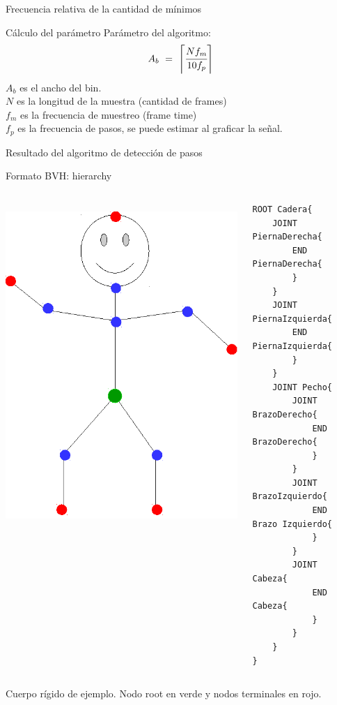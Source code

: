 \documentclass[aspectratio=169,spanish]{beamer} %
\begin{document}
\begin{frame}{Frecuencia relativa de la cantidad de mínimos}
    
\end{frame}

\begin{frame}{Cálculo del parámetro}
    Parámetro del algoritmo:
    \begin{equation}\label{ancho_b}
         A_b\ =\ \left\lceil \cfrac{N f_m}{10 f_p} \right\rceil
    \end{equation}
$A_b$ es el ancho del bin. \\    
$N$ es la longitud de la muestra (cantidad de frames) \\
$f_m$ es la frecuencia de muestreo (frame time) \\
$f_p$ es la frecuencia de pasos, se puede estimar al graficar la señal. 
\end{frame}

\begin{frame}{Resultado del algoritmo de detección de pasos}
    
\end{frame}

\begin{frame}[fragile]{Formato BVH: hierarchy}
    \begin{columns}
    \includegraphics[height = 0.70\textwidth]{../report/imagenes/palitos}
    {\tiny
    \begin{verbatim}
ROOT Cadera{
    JOINT PiernaDerecha{
        END PiernaDerecha{
        }
    }
    JOINT PiernaIzquierda{
        END PiernaIzquierda{
        }
    }
    JOINT Pecho{
        JOINT BrazoDerecho{
            END BrazoDerecho{
            }
        }
        JOINT BrazoIzquierdo{
            END Brazo Izquierdo{
            }
        }
        JOINT Cabeza{
            END Cabeza{
            }
        }
    }
}
    \end{verbatim}    
    }
    \end{columns}
    Cuerpo rígido de ejemplo. Nodo root en verde y nodos terminales en rojo. 
\end{frame}
\end{document}
